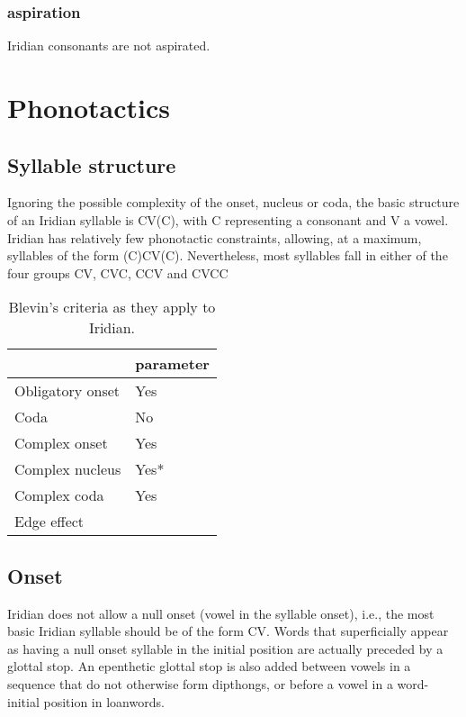 \subsubsection{aspiration}
\par Iridian consonants are not aspirated.

\section{Phonotactics}

\subsection{Syllable structure}

Ignoring the possible complexity of the onset, nucleus or coda, the basic structure of an Iridian syllable is CV(C), with C representing a consonant and V a vowel. Iridian has relatively few phonotactic constraints, allowing, at a maximum, syllables of the form (C)CV(C). Nevertheless, most syllables fall in either of the four groups CV, CVC, CCV and CVCC

\begin{table}[h!]
	\centering
	\caption{Blevin's criteria as they apply to Iridian.}
	\begin{tabularx}{0.6\textwidth}{YM}
		\toprule
		& {\sc parameter}\\
		\midrule
		Obligatory onset & Yes\\
		Coda & No\\
		Complex onset & Yes\\
		Complex nucleus & Yes*\\
		Complex coda & Yes\\
		Edge effect & \\
		\bottomrule
	\end{tabularx}
\end{table}


\subsection{Onset}

\par Iridian does not allow a null onset (vowel in the syllable onset), i.e., the most basic Iridian syllable should be of the form CV. Words that superficially appear as having a null onset syllable in the initial position are actually preceded by a glottal stop. An epenthetic glottal stop is also added between vowels in a sequence that do not otherwise form dipthongs, or before a vowel in a word-initial position in loanwords.


